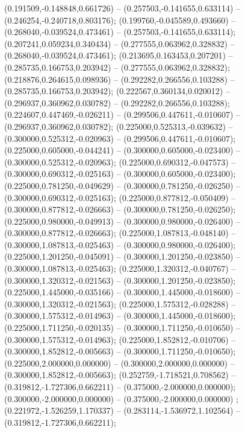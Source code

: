  (0.191509,-0.148848,0.661726) -- (0.257503,-0.141655,0.633114) -- (0.246254,-0.240718,0.803176);
 (0.199760,-0.045589,0.493660) -- (0.268040,-0.039524,0.473461) -- (0.257503,-0.141655,0.633114);
 (0.207241,0.059234,0.340434) -- (0.277555,0.063962,0.328832) -- (0.268040,-0.039524,0.473461);
 (0.213695,0.163453,0.207201) -- (0.285735,0.166753,0.203942) -- (0.277555,0.063962,0.328832);
 (0.218876,0.264615,0.098936) -- (0.292282,0.266556,0.103288) -- (0.285735,0.166753,0.203942);
 (0.222567,0.360134,0.020012) -- (0.296937,0.360962,0.030782) -- (0.292282,0.266556,0.103288);
 (0.224607,0.447469,-0.026211) -- (0.299506,0.447611,-0.010607) -- (0.296937,0.360962,0.030782);
 (0.225000,0.525313,-0.039632) -- (0.300000,0.525312,-0.020963) -- (0.299506,0.447611,-0.010607);
 (0.225000,0.605000,-0.044241) -- (0.300000,0.605000,-0.023400) -- (0.300000,0.525312,-0.020963);
 (0.225000,0.690312,-0.047573) -- (0.300000,0.690312,-0.025163) -- (0.300000,0.605000,-0.023400);
 (0.225000,0.781250,-0.049629) -- (0.300000,0.781250,-0.026250) -- (0.300000,0.690312,-0.025163);
 (0.225000,0.877812,-0.050409) -- (0.300000,0.877812,-0.026663) -- (0.300000,0.781250,-0.026250);
 (0.225000,0.980000,-0.049913) -- (0.300000,0.980000,-0.026400) -- (0.300000,0.877812,-0.026663);
 (0.225000,1.087813,-0.048140) -- (0.300000,1.087813,-0.025463) -- (0.300000,0.980000,-0.026400);
 (0.225000,1.201250,-0.045091) -- (0.300000,1.201250,-0.023850) -- (0.300000,1.087813,-0.025463);
 (0.225000,1.320312,-0.040767) -- (0.300000,1.320312,-0.021563) -- (0.300000,1.201250,-0.023850);
 (0.225000,1.445000,-0.035166) -- (0.300000,1.445000,-0.018600) -- (0.300000,1.320312,-0.021563);
 (0.225000,1.575312,-0.028288) -- (0.300000,1.575312,-0.014963) -- (0.300000,1.445000,-0.018600);
 (0.225000,1.711250,-0.020135) -- (0.300000,1.711250,-0.010650) -- (0.300000,1.575312,-0.014963);
 (0.225000,1.852812,-0.010706) -- (0.300000,1.852812,-0.005663) -- (0.300000,1.711250,-0.010650);
 (0.225000,2.000000,0.000000) -- (0.300000,2.000000,0.000000) -- (0.300000,1.852812,-0.005663);
 (0.252759,-1.718521,0.708562) -- (0.319812,-1.727306,0.662211) -- (0.375000,-2.000000,0.000000);
 (0.300000,-2.000000,0.000000) -- (0.375000,-2.000000,0.000000) ;
 (0.221972,-1.526259,1.170337) -- (0.283114,-1.536972,1.102564) -- (0.319812,-1.727306,0.662211);
